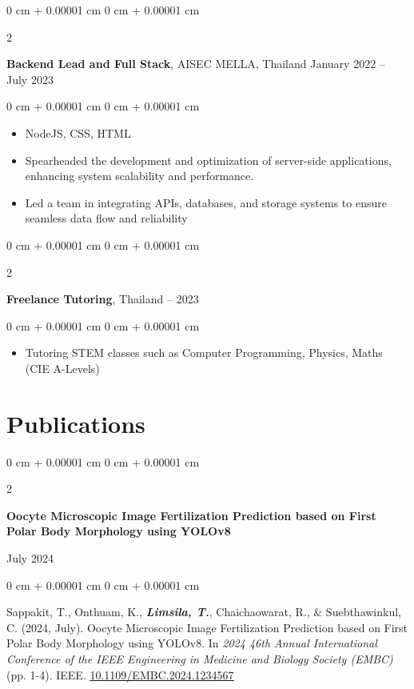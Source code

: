 \documentclass[10pt, letterpaper]{article}
\newenvironment{highlights}{
    \begin{itemize}[
        topsep=0.0 cm,
        parsep=0.0 cm,
        partopsep=0pt,
        itemsep=0pt,
        leftmargin=0 cm + 10pt
    ]
}{
    \end{itemize}
} %
\newenvironment{onecolentry}{
    \begin{adjustwidth}{
        0 cm + 0.00001 cm
    }{
        0 cm + 0.00001 cm
    }
}{
    \end{adjustwidth}
} %
\newenvironment{twocolentry}[2][]{
    \onecolentry
    \def\secondColumn{#2}
    \setcolumnwidth{\fill, 4.5 cm}
    \begin{paracol}{2}
}{
    \switchcolumn \raggedleft \secondColumn
    \end{paracol}
    \endonecolentry
} %
\begin{document}
        \vspace{0.2 cm}
        \begin{twocolentry}{January 2022 – July 2023}
        \textbf{Backend Lead and Full Stack}, AISEC MELLA, Thailand\end{twocolentry}
        \vspace{0.10 cm}
        \begin{onecolentry}\begin{highlights}
            \item NodeJS, CSS, HTML
            \item Spearheaded the development and optimization of server-side applications, enhancing system scalability and performance.
            \item Led a team in integrating APIs, databases, and storage systems to ensure seamless data flow and reliability
        \end{highlights}\end{onecolentry}

        \vspace{0.2 cm}
        \begin{twocolentry}{2020 – 2023}
        \textbf{Freelance Tutoring}, Thailand\end{twocolentry}
        \vspace{0.10 cm}
        \begin{onecolentry}\begin{highlights}
            \item Tutoring STEM classes such as Computer Programming, Physics, Maths (CIE A-Levels)
        \end{highlights}\end{onecolentry}
        
        \section{Publications}
        
        \begin{samepage}
            \begin{twocolentry}{July 2024}
                \textbf{Oocyte Microscopic Image Fertilization Prediction based on First Polar Body Morphology using YOLOv8}
            \end{twocolentry}
            
            \vspace{0.10 cm}
            
            \begin{onecolentry}
                Sappakit, T., Onthuam, K., \textbf{\textit{Limsila, T.}}, Chaichaowarat, R., \& Suebthawinkul, C. (2024, July). Oocyte Microscopic Image Fertilization Prediction based on First Polar Body Morphology using YOLOv8. In \textit{2024 46th Annual International Conference of the IEEE Engineering in Medicine and Biology Society (EMBC)} (pp. 1-4). IEEE. \href{https://ieeexplore.ieee.org/abstract/document/10782265}{\underline{10.1109/EMBC.2024.1234567}}
            \end{onecolentry}
        \end{samepage}
        
\end{document}
